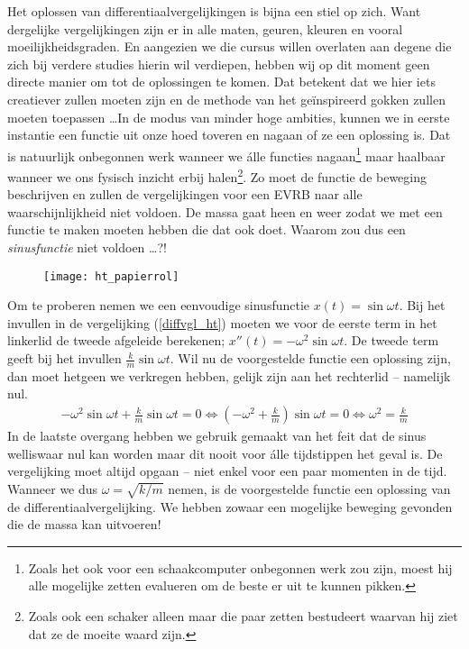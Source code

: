 Het oplossen van differentiaalvergelijkingen is bijna een stiel op zich. Want dergelijke vergelijkingen zijn er in alle maten, geuren, kleuren en vooral moeilijkheidsgraden. En aangezien we die cursus willen overlaten aan degene die zich bij verdere studies hierin wil verdiepen, hebben wij op dit moment geen directe manier om tot de oplossingen te komen. Dat betekent dat we hier iets creatiever zullen moeten zijn en de methode van het ge\"inspireerd gokken zullen moeten toepassen \ldots In de modus van minder hoge ambities, kunnen we in eerste instantie een functie uit onze hoed toveren en nagaan of ze een oplossing is. Dat is natuurlijk onbegonnen werk wanneer we \'alle functies nagaan\footnote{Zoals het ook voor een schaakcomputer onbegonnen werk zou zijn, moest hij alle mogelijke zetten evalueren om de beste er uit te kunnen pikken.} maar haalbaar wanneer we ons fysisch inzicht erbij halen\footnote{Zoals ook een schaker alleen maar die paar zetten bestudeert waarvan hij ziet dat ze de moeite waard zijn.}. Zo moet de functie de beweging beschrijven en zullen de vergelijkingen voor een EVRB naar alle waarschijnlijkheid niet voldoen. De massa gaat heen en weer zodat we met een functie te maken moeten hebben die dat ook doet. Waarom zou dus een \emph{sinusfunctie} niet voldoen \ldots?!
\begin{figure}[h]
\centering
\texttt{[image: ht\_papierrol]}
\end{figure}

Om te proberen nemen we een eenvoudige sinusfunctie $x(t)=\sin\omega t$. Bij het invullen in de vergelijking (\ref{diffvgl_ht}) moeten we voor de eerste term in het linkerlid de tweede afgeleide berekenen; $x''(t)=-\omega^2\sin\omega t$. De tweede term geeft bij het invullen $\frac{k}{m}\sin\omega t$. Wil nu de voorgestelde functie een oplossing zijn, dan moet hetgeen we verkregen hebben, gelijk zijn aan het rechterlid -- namelijk nul.
\begin{eqnarray*}
 -\omega^2\sin\omega t+\frac{k}{m}\sin\omega t=0\Leftrightarrow\left(-\omega^2+\frac{k}{m}\right)\sin\omega t=0\Leftrightarrow\omega^2=\frac{k}{m}
\end{eqnarray*}
In de laatste overgang hebben we gebruik gemaakt van het feit dat de sinus welliswaar nul kan worden maar dit nooit voor \'alle tijdstippen het geval is. De vergelijking moet altijd opgaan -- niet enkel voor een paar momenten in de tijd. Wanneer we dus $\omega=\sqrt{k/m}$ nemen, is de voorgestelde functie een oplossing van de differentiaalvergelijking. We hebben zowaar een mogelijke beweging gevonden die de massa kan uitvoeren!

